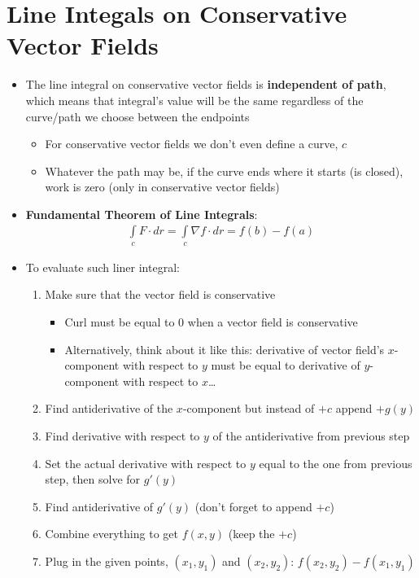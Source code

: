 \documentclass{article}
\begin{document}
\section{Line Integals on Conservative Vector Fields}
\begin{itemize}
  \item The line integral on conservative vector fields is \textbf{independent of path}, which means that integral's value will be the same regardless of the curve/path we choose between the endpoints
  \begin{itemize}
    \item For conservative vector fields we don't even define a curve, $c$
    \item Whatever the path may be, if the curve ends where it starts (is closed), work is zero (only in conservative vector fields)
  \end{itemize}
  \item \textbf{Fundamental Theorem of Line Integrals}:
  \begin{align}
    \int\limits_c F\cdot dr = \int\limits_c \nabla f\cdot dr = f(b) - f(a)
  \end{align}
  \item To evaluate such liner integral:
  \begin{enumerate}
    \item Make sure that the vector field is conservative
    \begin{itemize}
      \item Curl must be equal to 0 when a vector field is conservative 
      \item Alternatively, think about it like this: derivative of vector field's $x$-component with respect to $y$ must be equal to derivative of $y$-component with respect to $x$\dots
    \end{itemize}
    \item Find antiderivative of the $x$-component but instead of $+c$ append $+g(y)$
    \item Find derivative with respect to $y$ of the antiderivative from previous step
    \item Set the actual derivative with respect to $y$ equal to the one from previous step, then solve for $g'(y)$
    \item Find antiderivative of $g'(y)$ (don't forget to append $+c$)
    \item Combine everything to get $f(x,y)$ (keep the $+c$)
    \item Plug in the given points, $(x_1, y_1)$ and $(x_2, y_2)$: $f(x_2, y_2) - f(x_1, y_1)$

\end{enumerate}
\end{itemize}
\end{document}
